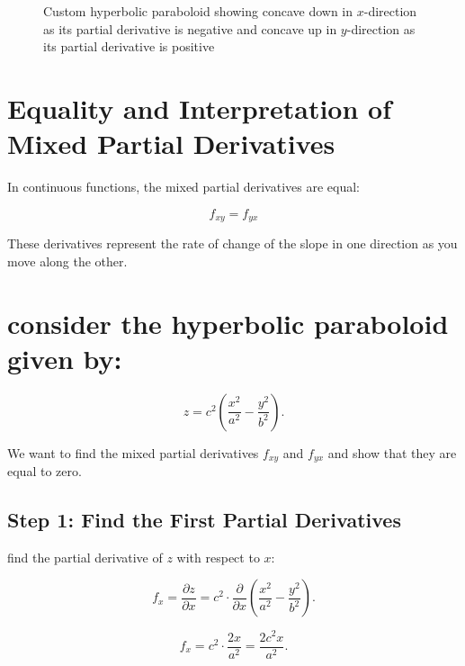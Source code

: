 \documentclass{article}
\begin{document}
\begin{figure}[h]
\centering
{}
\caption{Custom hyperbolic paraboloid showing concave down in \( x \)-direction as its partial derivative is negative and concave up in \( y \)-direction as its partial derivative is positive}
\label{fig:custom_pringle_inverse_long_axes}
\end{figure}

\section{Equality and Interpretation of Mixed Partial Derivatives}

In continuous functions, the mixed partial derivatives are equal:

\[
f_{xy} = f_{yx}
\]

These derivatives represent the rate of change of the slope in one direction as you move along the other.
\section{consider the hyperbolic paraboloid given by:}

\[
z = c^2 \left( \frac{x^2}{a^2} - \frac{y^2}{b^2} \right).
\]

We want to find the mixed partial derivatives \( f_{xy} \) and \( f_{yx} \) and show that they are equal to zero.

\subsection{Step 1: Find the First Partial Derivatives}

find the partial derivative of \( z \) with respect to \( x \):

\[
f_x = \frac{\partial z}{\partial x} = c^2 \cdot \frac{\partial}{\partial x} \left( \frac{x^2}{a^2} - \frac{y^2}{b^2} \right).
\]

\[
f_x = c^2 \cdot \frac{2x}{a^2} = \frac{2c^2 x}{a^2}.
\]
\end{document}
